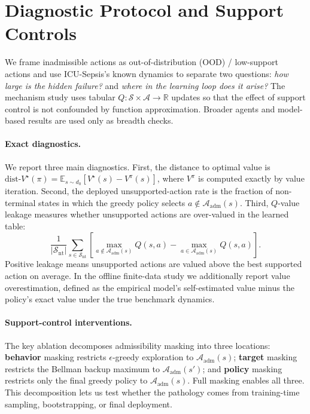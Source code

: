 \documentclass{article}
\newcommand{\Adm}{\mathcal{A}_{\mathrm{adm}}}
\newcommand{\dist}{\mathrm{dist}\text{-}V^\star}
\begin{document}
\section{Diagnostic Protocol and Support Controls}
\label{sec:method}
We frame inadmissible actions as out-of-distribution (OOD) / low-support actions
and use ICU-Sepsis's known dynamics to separate two questions: \emph{how large is
the hidden failure?} and \emph{where in the learning loop does it arise?} The
mechanism study uses tabular $Q:\mathcal{S}\times\mathcal{A}\to\mathbb{R}$
updates so that the effect of support control is not confounded by function
approximation. Broader agents and model-based results are used only as breadth
checks.

\paragraph{Exact diagnostics.}
We report three main diagnostics. First, the distance to optimal value is
$\dist(\pi)=\mathbb{E}_{s\sim d_0}[V^\star(s)-V^\pi(s)]$, where $V^\pi$ is
computed exactly by value iteration. Second, the deployed unsupported-action rate
is the fraction of non-terminal states in which the greedy policy selects
$a\notin\Adm(s)$. Third, $Q$-value leakage measures whether unsupported actions
are over-valued in the learned table:
\[
\frac{1}{|\mathcal{S}_{\mathrm{nt}}|}\sum_{s\in\mathcal{S}_{\mathrm{nt}}}
\left[\max_{a\notin\Adm(s)}Q(s,a)-\max_{a\in\Adm(s)}Q(s,a)\right].
\]
Positive leakage means unsupported actions are valued above the best supported
action on average. In the offline finite-data study we additionally report value
overestimation, defined as the empirical model's self-estimated value minus the
policy's exact value under the true benchmark dynamics.

\paragraph{Support-control interventions.}
The key ablation decomposes admissibility masking into three locations:
\textbf{behavior} masking restricts $\epsilon$-greedy exploration to $\Adm(s)$;
\textbf{target} masking restricts the Bellman backup maximum to $\Adm(s')$; and
\textbf{policy} masking restricts only the final greedy policy to $\Adm(s)$. Full
masking enables all three. This decomposition lets us test whether the pathology
comes from training-time sampling, bootstrapping, or final deployment.
\end{document}

